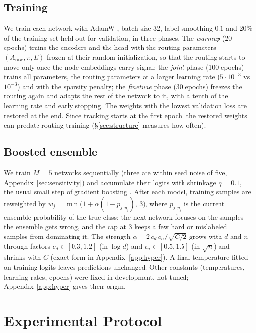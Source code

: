 \documentclass[anon,12pt]{clear2027} %
\begin{document}
\subsection{Training}
\label{sec:training}
We train each network with AdamW \citep{loshchilov2019adamw}, batch size 32, label smoothing $0.1$ \citep{szegedy2016rethinking} and 20\% of the training set held out for validation, in three phases. The \emph{warmup} (20 epochs) trains the encoders and the head with the routing parameters $(A_{\text{raw}},\pi,E)$ frozen at their random initialization, so that the routing starts to move only once the node embeddings carry signal; the \emph{joint} phase (100 epochs) trains all parameters, the routing parameters at a larger learning rate ($5\cdot10^{-3}$ vs $10^{-3}$) and with the sparsity penalty; the \emph{finetune} phase (30 epochs) freezes the routing again and adapts the rest of the network to it, with a tenth of the learning rate and early stopping. The weights with the lowest validation loss are restored at the end. Since tracking starts at the first epoch, the restored weights can predate routing training (\S\ref{sec:structure} measures how often).

\subsection{Boosted ensemble}
\label{sec:boosting}
We train $M=5$ networks sequentially (three are within seed noise of five, Appendix~\ref{sec:sensitivity}) and accumulate their logits with shrinkage $\eta=0.1$, the usual small step of gradient boosting \citep{friedman2001greedy}. After each model, training samples are reweighted by $w_j=\min\big(1+\alpha(1-p_{j,y_j}),\,3\big)$, where $p_{j,y_j}$ is the current ensemble probability of the true class: the next network focuses on the samples the ensemble gets wrong, and the cap at 3 keeps a few hard or mislabeled samples from dominating it. The strength $\alpha=2\,c_d\,c_n/\sqrt{C/2}$ grows with $d$ and $n$ through factors $c_d\in[0.3,1.2]$ (in $\log d$) and $c_n\in[0.5,1.5]$ (in $\sqrt n$) and shrinks with $C$ (exact form in Appendix~\ref{app:hyper}). A final temperature fitted on training logits leaves predictions unchanged. Other constants (temperatures, learning rates, epochs) were fixed in development, not tuned; Appendix~\ref{app:hyper} gives their origin.

\section{Experimental Protocol}
\label{sec:protocol}
\end{document}
